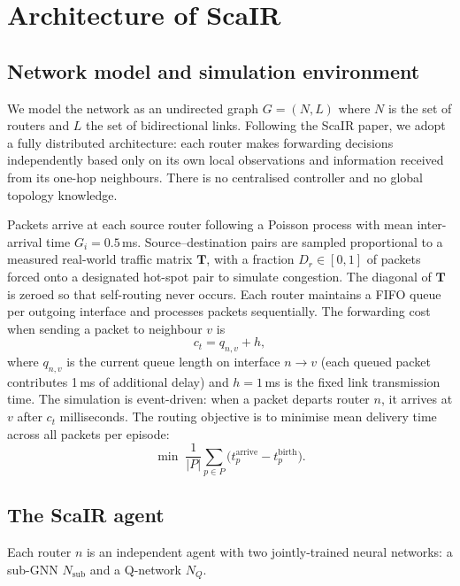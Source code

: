 \documentclass[10pt,twocolumn,letterpaper]{article}
\begin{document}
\section{Architecture of ScaIR}
\label{sec:arch}

\subsection{Network model and simulation environment}

We model the network as an undirected graph $G = (N, L)$ where $N$ is
the set of routers and $L$ the set of bidirectional links. Following the
ScaIR paper, we adopt a fully distributed architecture: each router
makes forwarding decisions independently based only on its own local
observations and information received from its one-hop neighbours.
There is no centralised controller and no global topology knowledge.

Packets arrive at each source router following a Poisson process with
mean inter-arrival time $G_i = 0.5$\,ms. Source--destination pairs are
sampled proportional to a measured real-world traffic matrix $\mathbf{T}$,
with a fraction $D_r \in [0,1]$ of packets forced onto a designated
hot-spot pair to simulate congestion. The diagonal of $\mathbf{T}$ is
zeroed so that self-routing never occurs. Each router maintains a FIFO
queue per outgoing interface and processes packets sequentially. The
forwarding cost when sending a packet to neighbour $v$ is
\begin{equation}
  c_t = q_{n,v} + h,
  \label{eq:cost}
\end{equation}
where $q_{n,v}$ is the current queue length on interface $n \!\to\! v$
(each queued packet contributes 1\,ms of additional delay) and $h =
1$\,ms is the fixed link transmission time. The simulation is
event-driven: when a packet departs router $n$, it arrives at $v$ after
$c_t$ milliseconds. The routing objective is to minimise mean delivery
time across all packets per episode:
\begin{equation}
  \min \;\frac{1}{|P|}\sum_{p \in P}
  \bigl(t_p^{\text{arrive}} - t_p^{\text{birth}}\bigr).
\end{equation}

\subsection{The ScaIR agent}

Each router $n$ is an independent agent with two jointly-trained neural
networks: a sub-GNN $N_{\text{sub}}$ and a Q-network $N_Q$.
\end{document}
